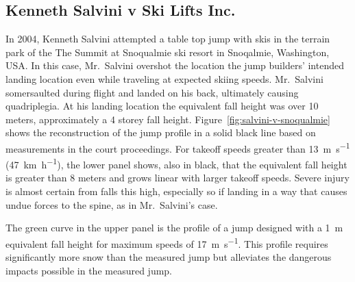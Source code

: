 \documentclass{article}
\begin{document}
\subsection{Kenneth Salvini v Ski Lifts Inc.}
%
In 2004, Kenneth Salvini attempted a table top jump with skis in the terrain
park of the The Summit at Snoqualmie ski resort in Snoqalmie, Washington, USA.
In this case, Mr.~Salvini overshot the location the jump builders' intended
landing location even while traveling at expected skiing speeds. Mr.~Salvini
somersaulted during flight and landed on his back, ultimately causing
quadriplegia. At his landing location the equivalent fall height was over 10
meters, approximately a 4 storey fall height.
Figure~\ref{fig:salvini-v-snoqualmie} shows the reconstruction of the jump
profile in a solid black line based on measurements in the court proceedings.
For takeoff speeds greater than 13~\si{\meter\per\second}
(47~\si{\kilo\meter\per\hour}), the lower panel shows, also in black, that the
equivalent fall height is greater than 8 meters and grows linear with larger
takeoff speeds. Severe injury is almost certain from falls this high,
especially so if landing in a way that causes undue forces to the spine, as in
Mr.~Salvini's case.

The green curve in the upper panel is the profile of a jump designed with a
1~\si{\meter} equivalent fall height for maximum speeds of
17~\si{\meter\per\second}. This profile requires significantly more snow than
the measured jump but alleviates the dangerous impacts possible in the measured
jump.
\end{document}
